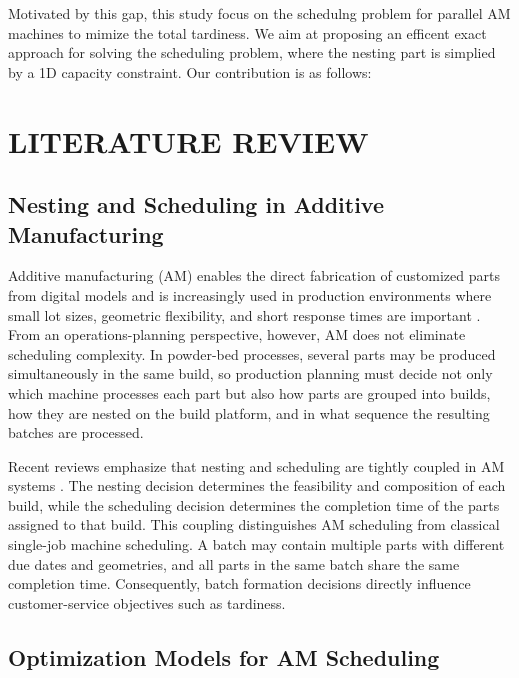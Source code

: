 \documentclass[review,3p,times,authoryear]{elsarticle}
\begin{document}
Motivated by this gap, this study focus on the schedulng problem for parallel AM machines to mimize the total tardiness. We aim at proposing an efficent exact approach for solving the scheduling problem, where the nesting part is simplied by a 1D capacity constraint. Our contribution is as follows:





\section{LITERATURE REVIEW}

\subsection{Nesting and Scheduling in Additive Manufacturing}

Additive manufacturing (AM) enables the direct fabrication of customized parts
from digital models and is increasingly used in production environments where
small lot sizes, geometric flexibility, and short response times are important
\citep{attaranRise3DPrinting2017}. From an operations-planning perspective,
however, AM does not eliminate scheduling complexity. In powder-bed processes,
several parts may be produced simultaneously in the same build, so production
planning must decide not only which machine processes each part but also how
parts are grouped into builds, how they are nested on the build platform, and
in what sequence the resulting batches are processed.

Recent reviews emphasize that nesting and scheduling are tightly coupled in AM
systems \citep{ohNestingSchedulingProblems2020,
pintoNestingSchedulingOptimization2024}. The nesting decision determines the
feasibility and composition of each build, while the scheduling decision
determines the completion time of the parts assigned to that build. This
coupling distinguishes AM scheduling from classical single-job machine
scheduling. A batch may contain multiple parts with different due dates and
geometries, and all parts in the same batch share the same completion time.
Consequently, batch formation decisions directly influence customer-service
objectives such as tardiness.

\subsection{Optimization Models for AM Scheduling}
\end{document}
